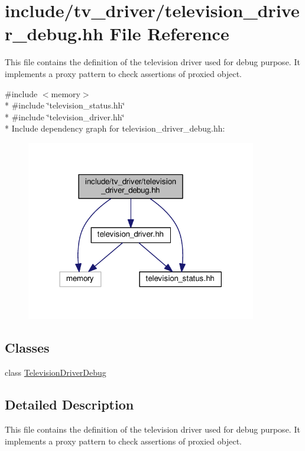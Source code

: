 \hypertarget{television__driver__debug_8hh}{\section{include/tv\+\_\+driver/television\+\_\+driver\+\_\+debug.hh File Reference}
\label{television__driver__debug_8hh}
}


This file contains the definition of the television driver used for debug purpose. It implements a proxy pattern to check assertions of proxied object.  


{\ttfamily \#include $<$memory$>$}\\*
{\ttfamily \#include \char`\"{}television\+\_\+status.\+hh\char`\"{}}\\*
{\ttfamily \#include \char`\"{}television\+\_\+driver.\+hh\char`\"{}}\\*
Include dependency graph for television\+\_\+driver\+\_\+debug.\+hh\+:
\nopagebreak
\begin{figure}[H]
\begin{center}
\leavevmode
\includegraphics[width=285pt]{television__driver__debug_8hh__incl}
\end{center}
\end{figure}
\subsection*{Classes}
\begin{DoxyCompactItemize}
\item 
class \hyperlink{classTelevisionDriverDebug}{Television\+Driver\+Debug}
\end{DoxyCompactItemize}


\subsection{Detailed Description}
This file contains the definition of the television driver used for debug purpose. It implements a proxy pattern to check assertions of proxied object. 

